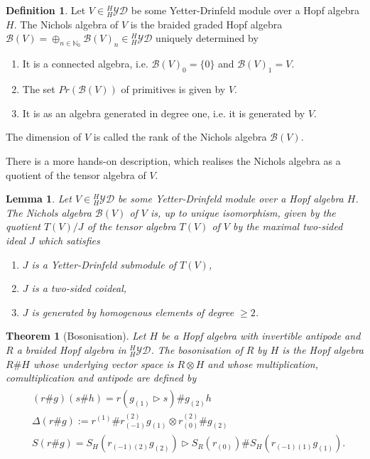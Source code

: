 \documentclass{amsart}
\newtheorem{theorem}{Theorem}
\newtheorem{lemma}{Lemma}
\theoremstyle{definition}
\newtheorem{definition}{Definition}
\newcommand{\YD}[1]{\ensuremath{{}^{#1}_{#1}\mathcal{YD}}}
\newcommand{\Nichols}[1]{\ensuremath{\mathcal{B}(#1)}}
\begin{document}
	\begin{definition}
		Let $V \in \YD{H}$ be some Yetter-Drinfeld module over a Hopf algebra $H$.
		The Nichols algebra of $V$ is the braided graded Hopf algebra $\Nichols V= \oplus_{n \in \mathbb N_0} \Nichols V_n\in \YD{H}$ uniquely determined by
		\begin{enumerate}
			\item It is a connected algebra, i.e. $\Nichols V_0 = \{0\}$ and $\Nichols V_1 = V$.
			\item The set  $Pr(\Nichols V)$ of primitives is given by $V$. 
			\item It is as an algebra generated in degree one, i.e. it is generated by $V$. 
		\end{enumerate}
		The dimension of $V$ is called the rank of the Nichols algebra $\Nichols V$.
	\end{definition}
	
	There is a more hands-on description, which realises the Nichols algebra as a quotient of the tensor algebra of $V$. 
	
	\begin{lemma}
		Let $V \in \YD{H}$ be some Yetter-Drinfeld module over a Hopf algebra $H$.
		The Nichols algebra $\Nichols V$ of $V$ is, up to unique isomorphism, given by the quotient $T(V)/J$ of the tensor algebra $T(V)$ of $V$ by the maximal two-sided ideal $J$ which satisfies
		\begin{enumerate}
			\item $J$ is a Yetter-Drinfeld submodule of $T(V)$,
			\item $J$ is a two-sided coideal,
			\item $J$ is generated by homogenous elements of degree $\geq 2$.
		\end{enumerate}
	\end{lemma}
	
	
		\begin{theorem}[Bosonisation]
		Let $H$ be a Hopf algebra with invertible antipode and $R$ a braided Hopf algebra in $^H_H \mathcal{YD}$. 
		The bosonisation of $R$ by $H$ is the Hopf algebra $R\#H$ whose underlying vector space is $R \otimes H$ and whose multiplication, comultiplication and antipode are defined by
		\begin{align*}
		\begin{aligned}
		& (r\#g)(s\#h)=r(g_{(1)}\triangleright s) \# g_{(2)}h
		\\
		& \Delta(r\#g):= r^{(1)}\#r^{(2)}_{(-1)}g_{(1)} \otimes r^{(2)}_{(0)}\# g_{(2)}
		\\
		& S(r\# g) = S_H(r_{(-1)(2)} g_{(2)})\triangleright S_R(r_{(0)})\#S_H(r_{(-1)(1)} g_{(1)}).
		\end{aligned}
		\end{align*}		
	\end{theorem}
	
\end{document}
